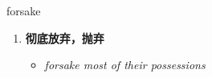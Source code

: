 
\begin{frame}
{\huge forsake}
\begin{center}
\begin{enumerate}\Large
  \item \textbf{彻底放弃，抛弃}
  \begin{itemize}
    \item \em{\Large{forsake most of their possessions}}
  \end{itemize}
\end{enumerate}
\end{center}
\end{frame}
